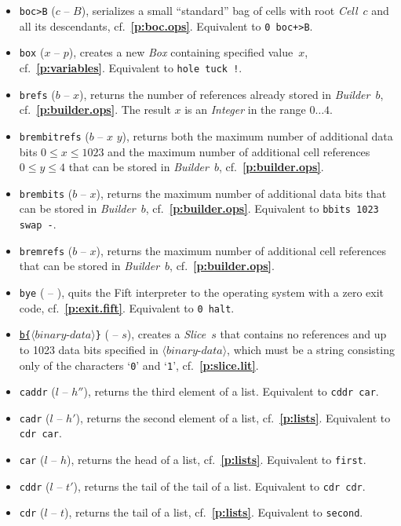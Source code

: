 \documentclass[12pt,oneside]{article}
\def\refpoint#1{{\rm\textbf{\ref{#1}}}}
\let\ptref=\refpoint
\begin{document}
\begin{itemize}
\item {\tt boc>B} ($c$ -- $B$), serializes a small ``standard'' bag of cells with root {\em Cell\/}~$c$ and all its descendants, cf.~\ptref{p:boc.ops}. Equivalent to {\tt 0 boc+>B}.
\item {\tt box} ($x$ -- $p$), creates a new {\em Box\/} containing specified value~$x$, cf.~\ptref{p:variables}. Equivalent to {\tt hole tuck !}.
\item {\tt brefs} ($b$ -- $x$), returns the number of references already stored in {\em Builder\/}~$b$, cf.~\ptref{p:builder.ops}. The result $x$ is an {\em Integer\/} in the range $0\dots4$.
\item {\tt brembitrefs} ($b$ -- $x$ $y$), returns both the maximum number of additional data bits $0\leq x\leq 1023$ and the maximum number of additional cell references $0\leq y\leq 4$ that can be stored in {\em Builder\/}~$b$, cf.~\ptref{p:builder.ops}.
\item {\tt brembits} ($b$ -- $x$), returns the maximum number of additional data bits that can be stored in {\em Builder\/}~$b$, cf.~\ptref{p:builder.ops}. Equivalent to {\tt bbits 1023 swap -}.
\item {\tt bremrefs} ($b$ -- $x$), returns the maximum number of additional cell references that can be stored in {\em Builder\/}~$b$, cf.~\ptref{p:builder.ops}.
\item {\tt bye} ( -- ), quits the Fift interpreter to the operating system with a zero exit code, cf.~\ptref{p:exit.fift}. Equivalent to {\tt 0 halt}.
\item {\tt \underline{b\{}$\langle\textit{binary-data}\rangle$\}} ( -- $s$), creates a {\em Slice}~$s$ that contains no references and up to 1023 data bits specified in $\langle\textit{binary-data}\rangle$, which must be a string consisting only of the characters `{\tt 0}' and `{\tt 1}', cf.~\ptref{p:slice.lit}.
\item {\tt caddr} ($l$ -- $h''$), returns the third element of a list. Equivalent to {\tt cddr car}.
\item {\tt cadr} ($l$ -- $h'$), returns the second element of a list, cf.~\ptref{p:lists}. Equivalent to {\tt cdr car}.
\item {\tt car} ($l$ -- $h$), returns the head of a list, cf.~\ptref{p:lists}. Equivalent to {\tt first}.
\item {\tt cddr} ($l$ -- $t'$), returns the tail of the tail of a list. Equivalent to {\tt cdr cdr}.
\item {\tt cdr} ($l$ -- $t$), returns the tail of a list, cf.~\ptref{p:lists}. Equivalent to {\tt second}.

\end{itemize}
\end{document}
